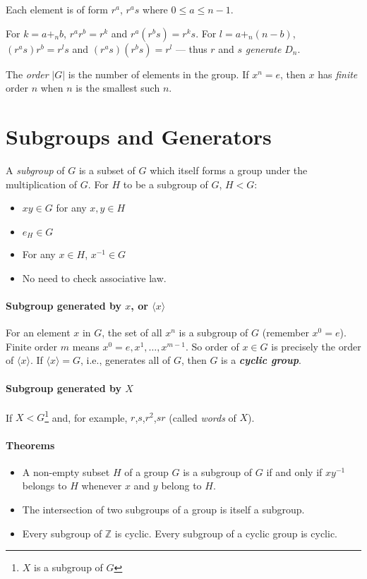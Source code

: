 \documentclass[a4paper,twocolumn,10pt]{article}
\begin{document}
  Each element is of form $r^a$, $r^as$ where $0\leqslant a\leqslant n-1$.

  For $k=a+_nb$, $r^ar^b=r^k$ and $r^a(r^bs)=r^ks$.  For $l=a+_n(n-b)$,
  $(r^as)r^b=r^ls$ and $(r^as)(r^bs)=r^l$ --- thus $r$ and $s$
  \textit{generate} $D_n$.

  The \textit{order} $|G|$ is the number of elements in the group. If $x^n=e$,
  then $x$ has \textit{finite} order $n$ when $n$ is the smallest such $n$.

  \section{Subgroups and Generators}
  A \textit{subgroup} of $G$ is a subset of $G$ which itself forms a group
  under the multiplication of $G$. For $H$ to be a subgroup of $G$, $H<G$:
  \begin{itemize}
    \item $xy \in G$ for any $x,y \in H$
    \item $e_H \in G$
    \item For any $x \in H$, $x^{-1} \in G$
    \item No need to check associative law.
  \end{itemize}

  \paragraph{Subgroup generated by $x$, or $\langle x \rangle$}
  For an element $x$ in $G$, the set of all $x^n$ is a subgroup of $G$
  (remember $x^0=e$). Finite order $m$ means $x^0=e, x^1, \ldots, x^{m-1}$.
  So order of $x\in G$ is precisely the order of $\langle x\rangle$. If
  $\langle x\rangle=G$, i.e., generates all of $G$, then $G$ is a
  \textbf{\textit{cyclic group}}.

  \paragraph{Subgroup generated by $X$} If $X<G$\footnote{$X$ is a subgroup of
  $G$} and, for example, $r$,$s$,$r^2$,$sr$
  (called \textit{words} of $X$).

  \paragraph{Theorems}
  \begin{itemize}
    \item A non-empty subset $H$ of a group $G$ is a subgroup of $G$ if and
      only if $xy^{-1}$ belongs to $H$ whenever $x$ and $y$ belong to $H$.
    \item The intersection of two subgroups of a group is itself a subgroup.
    \item Every subgroup of $\mathbb{Z}$ is cyclic. Every subgroup of a cyclic
      group is cyclic.
  \end{itemize}
\end{document}

